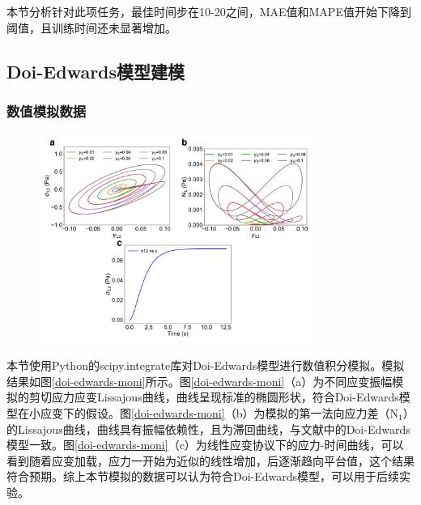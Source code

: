本节分析针对此项任务，最佳时间步在10-20之间，MAE值和MAPE值开始下降到阈值，且训练时间还未显著增加。


\subsection{Doi-Edwards模型建模}
\subsubsection{数值模拟数据}
\begin{figure}[htbp]
  \centering
  \includegraphics[width=0.8\textwidth]{Fig/doi-edwards-moni.pdf}
\end{figure}
本节使用Python的scipy.integrate库对Doi-Edwards模型进行数值积分模拟。模拟结果如图\ref{doi-edwards-moni}所示。图\ref{doi-edwards-moni}（a）为不同应变振幅模拟的剪切应力应变Lissajous曲线，曲线呈现标准的椭圆形状，符合Doi-Edwards模型在小应变下的假设。图\ref{doi-edwards-moni}（b）为模拟的第一法向应力差（N$_1$）的Lissajous曲线，曲线具有振幅依赖性，且为滞回曲线，与文献中的Doi-Edwards模型一致。图\ref{doi-edwards-moni}（c）为线性应变协议下的应力-时间曲线，可以看到随着应变加载，应力一开始为近似的线性增加，后逐渐趋向平台值，这个结果符合预期。综上本节模拟的数据可以认为符合Doi-Edwards模型，可以用于后续实验。

